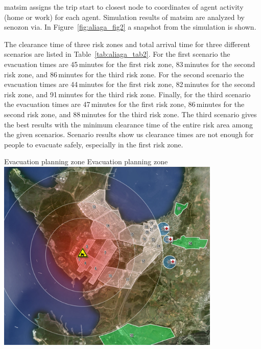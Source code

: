 \gls{matsim} assigns the trip start to closest node to coordinates of agent activity (\ie home or work) for each agent. Simulation results of \gls{matsim} are analyzed by \gls{senozon} \gls{via}. In Figure~\ref{fig:aliaga_fig2} a snapshot from the simulation is shown.

The clearance time of three risk zones and total arrival time for three different scenarios are listed in Table~\ref{tab:aliaga_tab2}. For the first scenario the evacuation times are 45\,minutes for the first risk zone, 83\,minutes for the second risk zone, and 86\,minutes for the third risk zone. For the second scenario the evacuation times are 44\,minutes for the first risk zone, 82\,minutes for the second risk zone, and 91\,minutes for the third risk zone. Finally, for the third scenario the evacuation times are 47\,minutes for the first risk zone, 86\,minutes for the second risk zone, and 88\,minutes for the third risk zone. The third scenario gives the best results with the minimum clearance time of the entire risk area among the given scenarios. Scenario results show us clearance times are not enough for people to evacuate safely, especially in the first risk zone.


\createfigure%
{Evacuation planning zone}%
{Evacuation planning zone}%
{\label{fig:aliaga_fig1}}%
{\includegraphics[width=0.8\textwidth, angle=0]{scenarios/figures/aliaga_fig1.png}}%
{}

